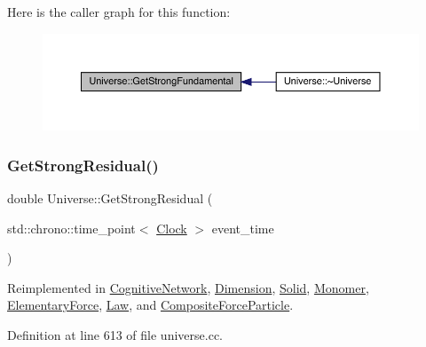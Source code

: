 Here is the caller graph for this function\+:
\nopagebreak
\begin{figure}[H]
\begin{center}
\leavevmode
\includegraphics[width=350pt]{class_universe_ab44daccba01ee7e3cf9b50bba83dd19e_icgraph}
\end{center}
\end{figure}
\mbox{\label{class_universe_af0f4b81950061e63c2855eb40957a5b1}} 
\subsubsection{\texorpdfstring{Get\+Strong\+Residual()}{GetStrongResidual()}}
{\footnotesize\ttfamily double Universe\+::\+Get\+Strong\+Residual (\begin{DoxyParamCaption}\item[{std\+::chrono\+::time\+\_\+point$<$ \hyperlink{universe_8h_a0ef8d951d1ca5ab3cfaf7ab4c7a6fd80}{Clock} $>$}]{event\+\_\+time }\end{DoxyParamCaption})\hspace{0.3cm}{\ttfamily [virtual]}}



Reimplemented in \hyperlink{class_cognitive_network_acfa5de663b3e686c4d9ea1a3bb483b11}{Cognitive\+Network}, \hyperlink{class_dimension_aeee6025f17d9cd1bf7f324d715a30691}{Dimension}, \hyperlink{class_solid_a9cfde1c3a4b7c6d2a5a3719d74e27237}{Solid}, \hyperlink{class_monomer_a3b00168520f592098356f7cd3e663ad3}{Monomer}, \hyperlink{class_elementary_force_a3478c8ad35bce240055da7d4a03e555e}{Elementary\+Force}, \hyperlink{class_law_a70fb2a7710776c4e2315a1e29fe35eb6}{Law}, and \hyperlink{class_composite_force_particle_a24214566eb5b44340d5563b6583052e8}{Composite\+Force\+Particle}.



Definition at line 613 of file universe.\+cc.


